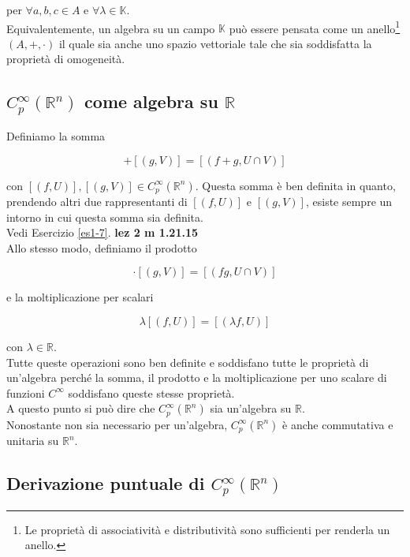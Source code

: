 per $ \forall a,b,c \in A $ e $ \forall \lambda \in \mathbb{K} $.\\
Equivalentemente, un algebra su un campo $ \mathbb{K} $ può essere pensata come un anello\footnote{%
	Le proprietà di associatività e distributività sono sufficienti per renderla un anello.%
} $ (A,+,\cdot) $ il quale sia anche uno spazio vettoriale tale che sia soddisfatta la proprietà di omogeneità.

\subsection{$ C_{p}^{\infty}(\mathbb{R}^{n}) $ come algebra su $ \mathbb{R} $}

Definiamo la somma

\begin{equation}
	[(f,U)] + [(g,V)] = [(f + g,U \cap V)]
\end{equation}

con $ [(f,U)], [(g,V)] \in C_{p}^{\infty}(\mathbb{R}^{n}) $. Questa somma è ben definita in quanto, prendendo altri due rappresentanti di $ [(f,U)] $ e $ [(g,V)] $, esiste sempre un intorno in cui questa somma sia definita.\\
Vedi Esercizio \ref{es1-7}. \textbf{lez 2 m 1.21.15}\\
Allo stesso modo, definiamo il prodotto

\begin{equation}
	[(f,U)] \cdot [(g,V)] = [(f g,U \cap V)]
\end{equation}

e la moltiplicazione per scalari

\begin{equation}
	\lambda [(f,U)] = [(\lambda f,U)]
\end{equation}

con $ \lambda \in \mathbb{R} $.\\
Tutte queste operazioni sono ben definite e soddisfano tutte le proprietà di un'algebra perché la somma, il prodotto e la moltiplicazione per uno scalare di funzioni $ C^{\infty} $ soddisfano queste stesse proprietà.\\
A questo punto si può dire che $ C_{p}^{\infty}(\mathbb{R}^{n}) $ sia un'algebra su $ \mathbb{R} $.\\
Nonostante non sia necessario per un'algebra, $ C_{p}^{\infty}(\mathbb{R}^{n}) $ è anche commutativa e unitaria su $ \mathbb{R}^{n} $.

\subsection{Derivazione puntuale di $ C_{p}^{\infty}(\mathbb{R}^{n}) $}

